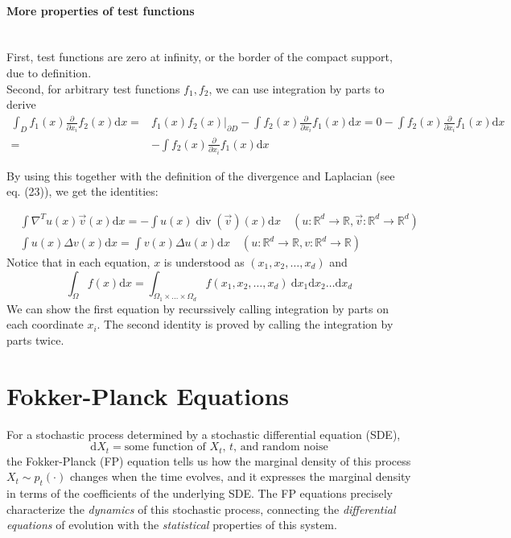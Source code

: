 \documentclass{article}
\begin{document}
\paragraph{More properties of test functions}
\ \\ \noindent
First, test functions are zero at infinity, or the border of the compact support, due to definition. 
\ \\ \noindent
Second, for arbitrary test functions $f_1, f_2$, we can use integration by parts to derive
\begin{equation}
\begin{aligned}
\int_D f_1(x) \frac{\partial}{\partial x_i} f_2(x) \mathrm{d} x
=&
f_1(x)f_2(x)\bigg|_{\partial D}
-\int f_2(x) \frac{\partial}{\partial x_i} f_1(x) \mathrm{d} x
=0-\int f_2(x) \frac{\partial}{\partial x_i} f_1(x) \mathrm{d} x
\\=&
-\int f_2(x) \frac{\partial}{\partial x_i} f_1(x) \mathrm{d} x
\end{aligned}
\end{equation}

\noindent 
By using this together with the definition of the divergence and Laplacian (see eq. (23)), we get the identities:

$$
\begin{aligned}
& \int \nabla^T u(x) {\vec{v}}(x) \mathrm{d} x=-\int u(x) \operatorname{div}\left({\vec{v}}\right)(x) \mathrm{d} x \quad\left(u: \mathbb{R}^d \rightarrow \mathbb{R}, {\vec{v}}: \mathbb{R}^d \rightarrow \mathbb{R}^d\right) \\
& \int u(x) \Delta {{v}}(x) \mathrm{d} x=\int {{v}}(x) \Delta u(x) \mathrm{d} x \quad\left(u: \mathbb{R}^d \rightarrow \mathbb{R}, {{v}}: \mathbb{R}^d \rightarrow \mathbb{R}\right)
\end{aligned}
$$
Notice that in each equation, $x$ is understood as 
$(x_1,x_2,\ldots, x_d)$ and 
$$\int_\Omega f(x) \mathrm{d}x=\int_{\Omega_1\times \ldots \times \Omega_d} f(x_1,x_2,\ldots,x_d) \ \mathrm{d}x_1\mathrm{d}x_2\ldots \mathrm{d}x_d
$$
We can show the first equation by recurssively calling integration by parts on each coordinate $x_i$. The second identity is proved by calling the integration by parts twice. 


\section{Fokker-Planck Equations}
For a stochastic process determined by a stochastic differential equation (SDE), 
$$
\mathrm{d}X_t=\text{some function of $X_t$, $t$, and random noise}
$$the Fokker-Planck (FP) equation tells us how the marginal density of this process $X_t \sim p_t(\cdot)$ changes when the time evolves, and it expresses the marginal density in terms of the coefficients of the underlying SDE. The FP equations precisely characterize the \emph{dynamics} of this stochastic process, connecting the \emph{differential equations} of evolution with the \emph{statistical} properties of this system. 
\end{document}
